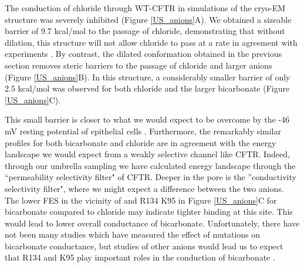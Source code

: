 The conduction of chloride through WT-CFTR in simulations of the cryo-EM structure was severely inhibited (Figure \ref{US_anions}A). We obtained a sizeable barrier of 9.7 kcal/mol to the passage of chloride, demonstrating that without dilation, this structure will not allow chloride to pass at a rate in agreement with experiments \cite{gong2004}. By contrast, the dilated conformation obtained in the previous section removes steric barriers to the passage of chloride and larger anions (Figure \ref{US_anions}B). In this structure, a considerably smaller barrier of only 2.5 kcal/mol was observed for both chloride and the larger bicarbonate (Figure \ref{US_anions}C). 

This small barrier is closer to what we would expect to be overcome by the -46 mV resting potential of epithelial cells \cite{josephson1979}. Furthermore, the remarkably similar profiles for both bicarbonate and chloride are in agreement with the energy landscape we would expect from a weakly selective channel like CFTR. Indeed, through our umbrella sampling we have calculated energy landscape through the ``permeability selectivity filter" of CFTR. Deeper in the pore is the ''conductivity selectivity filter", where we might expect a difference between the two anions. The lower FES in the vicinity of and R134 K95 in Figure \ref{US_anions}C for bicarbonate compared to chloride may indicate tighter binding at this site. This would lead to lower overall conductance of bicarbonate. Unfortunately, there have not been many studies which have measured the effect of mutations on bicarbonate conductance, but studies of other anions would lead us to expect that R134 and K95 play important roles in the conduction of bicarbonate \cite{linsdell2016}. 

